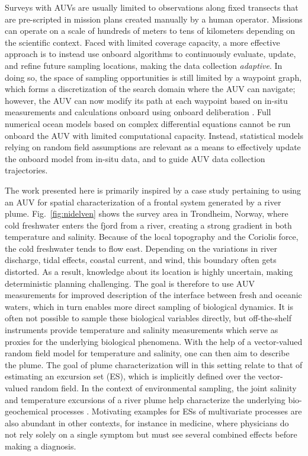 \documentclass[aoas]{imsart}
\begin{document}
Surveys with AUVs are usually limited to observations along fixed
transects that are pre-scripted in mission plans created manually by a
human operator. Missions can operate on a scale of
hundreds of meters to tens of kilometers depending on the scientific
context. Faced with limited coverage capacity, a more effective
approach is to instead use onboard algorithms to continuously
evaluate, update, and refine future sampling locations, making the
data collection \emph{adaptive}.  In doing so, the space of sampling
opportunities is still limited by a waypoint graph, which forms a
discretization of the search domain where the AUV can navigate;
however, the AUV can now modify its path at each waypoint based on
in-situ measurements and calculations onboard using onboard
deliberation \citep{py10,Rajan12,Rajan12b}.  Full numerical ocean
models based on complex differential equations cannot be run onboard
the AUV with limited computational capacity. Instead, statistical models
relying on random field assumptions are relevant as a means to
effectively update the onboard model from in-situ data, and to guide
AUV data collection trajectories.

The work presented here is primarily inspired by a case study
pertaining to using an AUV for spatial characterization of a frontal
system generated by a river plume. Fig.~\ref{fig:nidelven} shows the
survey area in Trondheim, Norway, where cold freshwater enters the fjord from a river, creating a strong gradient in both temperature and
salinity. Because of the local topography and the Coriolis force, the
cold freshwater tends to flow east. Depending on the variations in river discharge, tidal effects, coastal current, and wind, this boundary often gets distorted. As a result, knowledge about its location is highly uncertain, making deterministic planning challenging. The goal is therefore to use AUV measurements for improved description of the
interface between fresh and oceanic waters, which in turn enables more direct sampling of biological dynamics. It is often not possible
to sample these biological variables directly, but off-the-shelf instruments provide temperature and
salinity measurements which serve as proxies for the underlying
biological phenomena. With the help of a vector-valued random field
model for temperature and salinity, one can then aim to describe the
plume. The goal of plume characterization will in this setting relate to that of estimating an excursion set (ES), which is implicitly defined over the vector-valued random field. 
In the context of environmental sampling, the joint salinity and
temperature excursions of a river plume help characterize the
underlying bio-geochemical processes
\citep{hopkins2013detection,Pinto2018}. Motivating examples for ESs of
multivariate processes are also abundant in other contexts, for
instance in medicine, where physicians do not rely solely on a single
symptom but must see several combined effects before making a
diagnosis.
\end{document}
